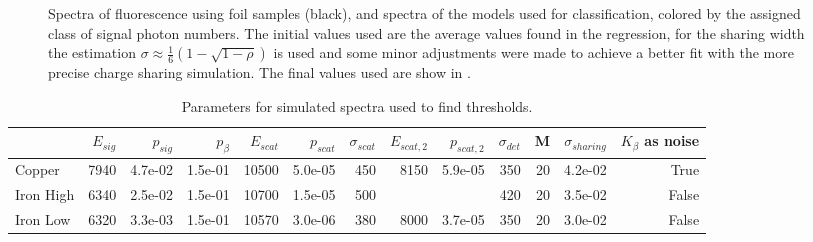 \begin{figure}[h!]
\begin{subfigure}[b]{0.30\textwidth}
	\end{subfigure}
	\caption[Spectra of fluorescence using foil samples with photon number classes]{Spectra of fluorescence using foil samples (black), and spectra of the models used for classification, colored by the assigned class of signal photon numbers. The initial values used are the average values found in the regression, for the sharing width the estimation $\sigma\approx\frac{1}{6} \left(1-\sqrt{1-\rho }\right)$ is used and some minor adjustments were made to achieve a better fit with the more precise charge sharing simulation. The final values used are show in .}
	\label{fig:thresholdsfoil}
\end{figure}
\begin{table}[]
	\centering
	\caption{Parameters for simulated spectra used to find thresholds.}
	\label{tab:fitvalues}
		\tiny
	\begin{adjustwidth}{-2em}{-2em}	
\begin{tabular}{lrrrrrrrrrrrr}

	\toprule
	{} &  $E_{sig}$ &  $p_{sig}$ &  $p_{\beta}$ &  $E_{scat}$ &  $p_{scat}$ &  $\sigma_{scat}$ & $E_{scat,2}$ & $p_{scat,2}$ &  $\sigma_{det}$ &   M &  $\sigma_{sharing}$ &  $K_{\beta}$ as noise \\	\midrule
	Copper &          7940 &       4.7e-02 &     1.5e-01 &          10500 &        5.0e-05 &                 450 &           8150 &        5.9e-05 &             350 &  20 &             4.2e-02 &                  True \\
	Iron High         &          6340 &       2.5e-02 &     1.5e-01 &          10700 &        1.5e-05 &                 500 &                &                &             420 &  20 &             3.5e-02 &                 False \\
	Iron Low          &          6320 &       3.3e-03 &     1.5e-01 &          10570 &        3.0e-06 &                 380 &           8000 &        3.7e-05 &             350 &  20 &             3.0e-02 &                 False \\
	\bottomrule

\end{tabular}
\end{adjustwidth}
\end{table}
